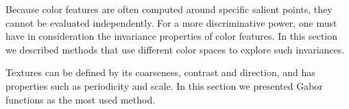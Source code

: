 Because color features are often computed around specific salient points, they cannot be evaluated independently. For a more discriminative power, one must have in consideration the invariance properties of color features. In this section we described methods that use different color spaces to explore such invariances.

Textures can be defined by its coarseness, contrast and direction, and has properties such as periodicity and scale. In this section we presented Gabor functions as the most used method.